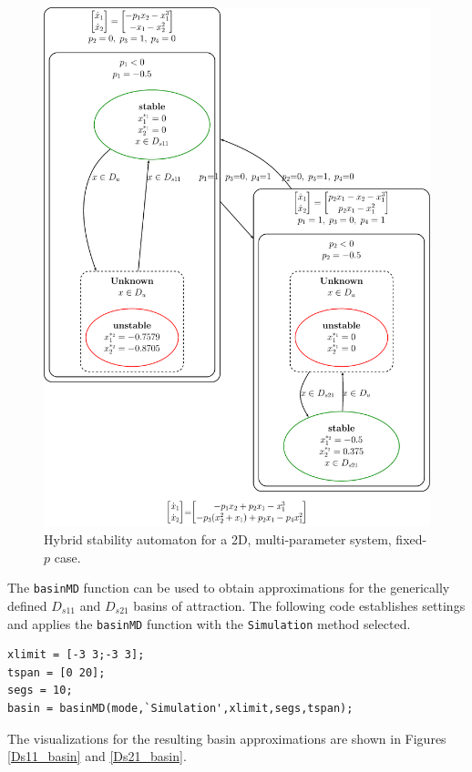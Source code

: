 \documentclass[12pt]{article}
\begin{document}
\begin{figure}[H]
\begin{center}
\includegraphics[width=4.5in]{MDMP_fpTex.pdf}
\caption{Hybrid stability automaton for a 2D, multi-parameter system, fixed-$p$ case.}
\label{MDMP_fp}
\end{center}
\end{figure}

The \texttt{basinMD} function can be used to obtain approximations for the generically defined $D_{s11}$ and $D_{s21}$ basins of attraction. The following code establishes settings and applies the \texttt{basinMD} function with the \texttt{Simulation} method selected.

\begin{addmargin}[0.5in]{1em}
\begin{lstlisting}
xlimit = [-3 3;-3 3];
tspan = [0 20];
segs = 10; 
basin = basinMD(mode,`Simulation',xlimit,segs,tspan);
\end{lstlisting}
\end{addmargin}

\noindent The visualizations for the resulting basin approximations are shown in Figures \ref{Ds11_basin} and \ref{Ds21_basin}.
\end{document}
